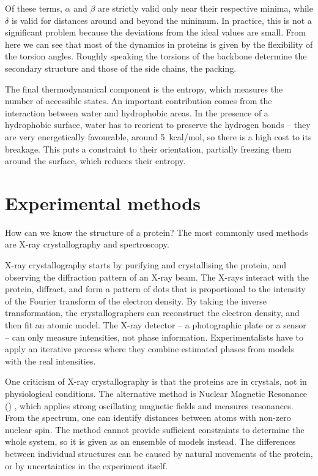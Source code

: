 Of these terms, $\alpha$ and $\beta$ are strictly valid only near their respective minima, while $\delta$ is valid for distances around and beyond the minimum.
In practice, this is not a significant problem because the deviations from the ideal values are small. 
From here we can see that most of the dynamics in proteins is given by the flexibility of the torsion angles.
Roughly speaking the torsions of the backbone determine the secondary structure and those of the side chains, the packing.

The final thermodynamical component is the entropy,  which measures the number of accessible states.
An important contribution comes from the interaction between water and hydrophobic areas.
In the presence of a hydrophobic surface, water has to reorient to preserve the hydrogen bonds -- they are very energetically favourable, around \SI{5}{kcal/mol}, so there is a high cost to its breakage.
This puts a constraint to their orientation, partially freezing them around the surface, which reduces their entropy.

\section{Experimental methods}
How can we know the structure of a protein?
The most commonly used methods are X-ray crystallography and \NMR{} spectroscopy.


X-ray crystallography starts by
purifying and crystallising the protein, and observing the diffraction pattern of an X-ray beam.
The X-rays interact with the protein, diffract, and form a pattern of dots that is proportional to the intensity of the Fourier transform of the electron density.
By taking the inverse transformation, the crystallographers can reconstruct the electron density, and then fit an atomic model.
The X-ray detector -- a photographic plate or a \CCD{} sensor -- can only measure intensities, not phase information.
Experimentalists have to apply an iterative process where they combine estimated phases from models with the real intensities.

One criticism of X-ray crystallography is that the proteins are in crystals, not in physiological conditions.
The alternative method is Nuclear Magnetic Resonance (\NMR) \citep{nmr}, \sidenote{\NMR} which applies strong oscillating magnetic fields and measures resonances.
From the spectrum, one can identify distances between atoms with non-zero nuclear spin.
The method cannot provide sufficient constraints to determine the whole system, so it is given as an ensemble of models instead.
The differences between individual structures can be caused by natural movements of the protein, or by uncertainties in the experiment itself.

